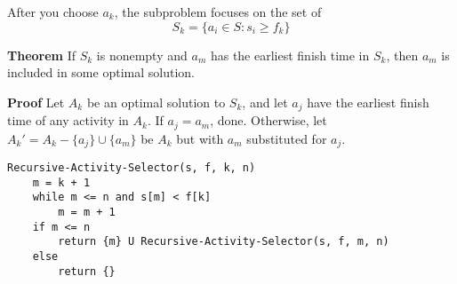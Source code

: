 \documentclass{article}
\begin{document}
After you choose \(a_k\), the subproblem focuses on the set of
\begin{equation*}
    S_k = \{ a_i \in S : s_i \geq f_k\}
\end{equation*}

\textbf{Theorem}
If \(S_k\) is nonempty and \(a_m\) has the earliest finish time in \(S_k\), then
\(a_m\) is included in some optimal solution.

\textbf{Proof} Let \(A_k\) be an optimal solution to \(S_k\), and let \(a_j\)
have the earliest finish time of any activity in \(A_k\). If \(a_j = a_m\),
done. Otherwise, let \(A_k' = A_k - \{ a_j \} \cup \{ a_m \}\) be \(A_k\) but
with \(a_m\) substituted for \(a_j\).

\begin{verbatim}
Recursive-Activity-Selector(s, f, k, n)
    m = k + 1
    while m <= n and s[m] < f[k]
        m = m + 1
    if m <= n
        return {m} U Recursive-Activity-Selector(s, f, m, n)
    else
        return {}
\end{verbatim}
\end{document}
